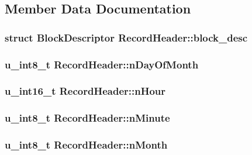 \subsection{Member Data Documentation}
\hypertarget{structRecordHeader_a7978ce5ffe661553c29095b2d6e4f5ff}{
\subsubsection[{block\-\_\-desc}]{\setlength{\rightskip}{0pt plus 5cm}struct {\bf Block\-Descriptor} Record\-Header\-::block\-\_\-desc}}\label{structRecordHeader_a7978ce5ffe661553c29095b2d6e4f5ff}
\hypertarget{structRecordHeader_aae558468424437231838e93dd67fbc90}{
\subsubsection[{n\-Day\-Of\-Month}]{\setlength{\rightskip}{0pt plus 5cm}u\-\_\-int8\-\_\-t Record\-Header\-::n\-Day\-Of\-Month}}\label{structRecordHeader_aae558468424437231838e93dd67fbc90}
\hypertarget{structRecordHeader_af193bef18555926c67fcfcf8c1ef085a}{
\subsubsection[{n\-Hour}]{\setlength{\rightskip}{0pt plus 5cm}u\-\_\-int16\-\_\-t Record\-Header\-::n\-Hour}}\label{structRecordHeader_af193bef18555926c67fcfcf8c1ef085a}
\hypertarget{structRecordHeader_ab1766b542399f561a846005f260ff19e}{
\subsubsection[{n\-Minute}]{\setlength{\rightskip}{0pt plus 5cm}u\-\_\-int8\-\_\-t Record\-Header\-::n\-Minute}}\label{structRecordHeader_ab1766b542399f561a846005f260ff19e}
\hypertarget{structRecordHeader_acf999654ab3109a2f640142b42fb8ba2}{
\subsubsection[{n\-Month}]{\setlength{\rightskip}{0pt plus 5cm}u\-\_\-int8\-\_\-t Record\-Header\-::n\-Month}}\label{structRecordHeader_acf999654ab3109a2f640142b42fb8ba2}
